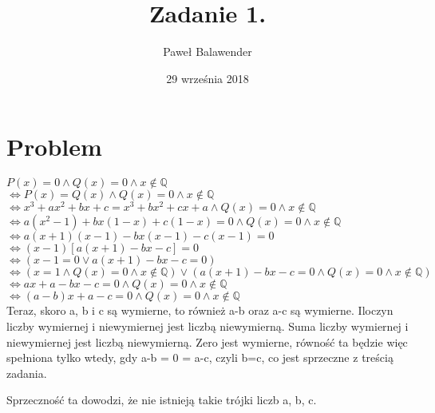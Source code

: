 \documentclass[11pt]{article}
\title{Zadanie 1.}
\date{29 września 2018}
\author{Paweł Balawender}
\begin{document}
\maketitle

\section*{Problem}
$P(x) = 0 \land Q(x) = 0 \land x \notin \mathbb{Q}$\\
$\iff P(x) = Q(x) \land Q(x) = 0 \land x \notin \mathbb{Q}$\\
$\iff x^3+ax^2+bx+c = x^3+bx^2+cx+a \land Q(x)=0 \land x \notin\mathbb{Q}$\\
$\iff a(x^2 - 1) + bx(1 - x) + c(1 - x) = 0 \land Q(x) = 0 \land x \notin \mathbb{Q}$\\
$\iff a(x+1)(x-1) - bx(x-1) - c(x-1) = 0$\\
$\iff (x-1)[a(x+1) -bx -c] = 0$\\
$\iff (x-1 = 0 \lor a(x+1)-bx-c = 0) $\\
$\iff (x = 1 \land Q(x) = 0 \land x \notin \mathbb{Q}) \lor (a(x+1)-bx-c=0 \land Q(x) = 0 \land x \notin \mathbb{Q})$\\
$\iff ax+a-bx-c=0 \land Q(x) = 0 \land x \notin \mathbb{Q}$\\
$\iff (a-b)x + a - c = 0 \land Q(x) = 0 \land x \notin \mathbb{Q}$\\

Teraz, skoro a, b i c są wymierne, to również a-b oraz a-c są wymierne. Iloczyn liczby wymiernej i niewymiernej jest liczbą niewymierną. Suma liczby wymiernej i niewymiernej jest liczbą niewymierną.
Zero jest wymierne, równość ta będzie więc spełniona tylko wtedy, gdy a-b = 0 = a-c, czyli b=c, co jest sprzeczne z treścią zadania.

Sprzeczność ta dowodzi, że nie istnieją takie trójki liczb a, b, c.
\end{document}
